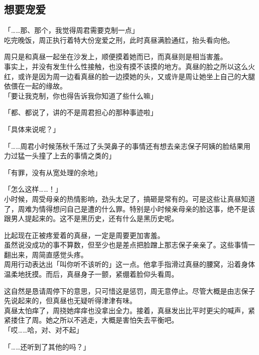 \subsection{想要宠爱}

「……那、那个，我觉得周君需要克制一点」\\

吃完晚饭，周正执行着特大份宠爱之刑，此时真昼满脸通红，抬头看向他。

周只是和真昼一起坐在沙发上，顺便摸着她而已，而真昼则是相当害羞。\\

事实上，并没有发生什么性接触，也没有摸不该摸的地方。真昼的脸之所以这么火红，或许是因为周一边看真昼的脸一边摸她的头，又或许是周让她坐上自己的大腿依偎在一起的缘故。\\

「要让我克制，你也得告诉我你知道了些什么嘛」

「都、都说了，讲的不是周君担心的那种事迹啦」

「具体来说呢？」

「……周君小时候荡秋千荡过了头哭鼻子的事情还有想去亲志保子阿姨的脸结果用力过猛一头撞了上去的事情之类的」

「有罪，没有从宽处理的余地」

「怎么这样……！」\\

小时候，周受母亲的热情影响，劲头太足了，搞砸是常有的。可是这些让真昼知道了，周难为情得想问自己是遭的什么罪。特别是小时候亲母亲的脸这事，绝不是该跟男人提起来的。这不是黑历史，还有什么是黑历史呢。

比起现在正被疼爱着的真昼，一定是周要更加害羞。\\

虽然说没成功的事不算数，但至少也是差点把脸蹭上那志保子亲亲了。这些事情一翻出来，周简直感觉头疼。\\

周用行动表达出「叫你听不该听的」这一点。他拿手指滑过真昼的腰窝，沿着身体温柔地抚摸。而后，真昼身子一颤，紧绷着脸仰头看周。

这自然是恳请周停下的意思，只可惜这是惩罚，周无意停止。尽管大概是由志保子先说起来的，但真昼也无疑听得津津有味。\\

真昼太怕痒了，周挠她痒痒也没拿出全力。接着，真昼发出比平时更尖的喊声，紧紧搂住了周。她之所以不逃走，大概是害怕失去平衡吧。\\

「哎……哈，对、对不起」

「……还听到了其他的吗？」

